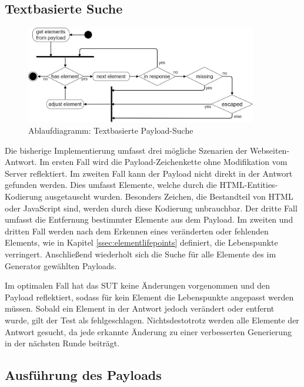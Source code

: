 \subsection{Textbasierte Suche} \label{ssec:textbase-search}

\begin{figure}[htbp] 
	\centering
	\includegraphics[width=0.9\textwidth]{contents/images/SmartGrazerTextBasedSearch}
	\caption{Ablaufdiagramm: Textbasierte Payload-Suche}
	\label{fig:textbasedsearch}
\end{figure}

Die bisherige Implementierung umfasst drei mögliche Szenarien der Webseiten-Antwort. Im ersten Fall wird die Payload-Zeichenkette ohne Modifikation vom Server reflektiert. Im zweiten Fall kann der Payload nicht direkt in der Antwort gefunden werden. Dies umfasst Elemente, welche durch die HTML-Entities-Kodierung ausgetauscht wurden. Besonders Zeichen, die Bestandteil von HTML oder JavaScript sind, werden durch diese Kodierung unbrauchbar. Der dritte Fall umfasst die Entfernung bestimmter Elemente aus dem Payload. Im zweiten und dritten Fall werden nach dem Erkennen eines veränderten oder fehlenden Elements, wie in Kapitel \ref{ssec:elementlifepoints} definiert, die Lebenspunkte verringert. Anschließend wiederholt sich die Suche für alle Elemente des im Generator gewählten Payloads.

Im optimalen Fall hat das \ac{SUT} keine Änderungen vorgenommen und den Payload reflektiert, sodass für kein Element die Lebenspunkte angepasst werden müssen. Sobald ein Element in der Antwort jedoch verändert oder entfernt wurde, gilt der Test als fehlgeschlagen. Nichtsdestotrotz werden alle Elemente der Antwort gesucht, da jede erkannte Änderung zu einer verbesserten Generierung in der nächsten Runde beiträgt.

\subsection{Ausführung des Payloads}\label{AusführungDesPayload}

